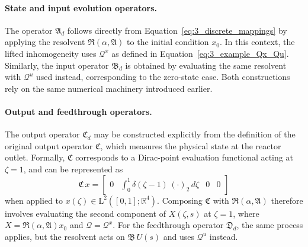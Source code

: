 \paragraph{State and input evolution operators.}  
The operator $\mathfrak{A}_d$ follows directly from Equation~\eqref{eq:3_discrete_mappings} by applying the resolvent $\mathfrak{R}(\alpha, \mathfrak{A})$ to the initial condition $x_0$. In this context, the lifted inhomogeneity uses $\mathcal{Q}^x$ as defined in Equation~\eqref{eq:3_example_Qx_Qu}. Similarly, the input operator $\mathfrak{B}_d$ is obtained by evaluating the same resolvent with $\mathcal{Q}^u$ used instead, corresponding to the zero-state case. Both constructions rely on the same numerical machinery introduced earlier.

\paragraph{Output and feedthrough operators.}  
The output operator $\mathfrak{C}_d$ may be constructed explicitly from the definition of the original output operator $\mathfrak{C}$, which measures the physical state at the reactor outlet. Formally, $\mathfrak{C}$ corresponds to a Dirac-point evaluation functional acting at $\zeta = 1$, and can be represented as
\begin{equation}
\mathfrak{C}\,x = \begin{bmatrix}
0 & \int_0^1 \delta(\zeta - 1)\,(\cdot)_2\,d\zeta & 0 & 0
\end{bmatrix}
\end{equation}
when applied to $x(\zeta) \in \mathrm{L}^2([0,1]; \mathbb{R}^4)$. Composing $\mathfrak{C}$ with $\mathfrak{R}(\alpha, \mathfrak{A})$ therefore involves evaluating the second component of $X(\zeta, s)$ at $\zeta = 1$, where $X = \mathfrak{R}(\alpha, \mathfrak{A}) x_0$ and $\mathcal{Q} = \mathcal{Q}^x$. For the feedthrough operator $\mathfrak{D}_d$, the same process applies, but the resolvent acts on $\mathfrak{B}\,U(s)$ and uses $\mathcal{Q}^u$ instead.

